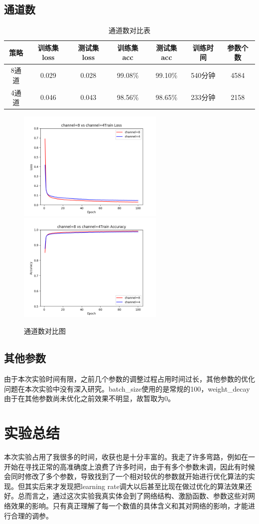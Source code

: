 \documentclass[11pt,utf8]{article}
\begin{document}
          \subsection*{通道数}
            \begin{table}[h]
              \centering
              \begin{tabular}{|c|c|c|c|c|c|c|}\hline
                策略&训练集loss&测试集loss&训练集acc&测试集acc&训练时间&参数个数\\\hline
                8通道&0.029&0.028&99.08\%&99.10\%&540分钟&4584\\
                4通道&0.046&0.043&98.56\%&98.65\%&233分钟&2158\\\hline
              \end{tabular}
              \caption{通道数对比表}
              \label{tab:Margin_settings}
            \end{table}
            \begin{figure}
              \begin{center}
                \includegraphics[width=7cm]{result/channel=8vschannel=4_loss.png}
                \includegraphics[width=7cm]{result/channel=8vschannel=4_acc.png}\\
                \caption{通道数对比图}
              \end{center}
            \end{figure}
          \subsection*{其他参数}
            \indent 由于本次实验时间有限，之前几个参数的调整过程占用时间过长，其他参数的优化问题在本次实验中没有深入研究。batch\_size使用的是常规的100，weight\_decay由于在其他参数尚未优化之前效果不明显，故暂取为0。\\
        \section*{实验总结}
          \indent 本次实验占用了我很多的时间，收获也是十分丰富的。我走了许多弯路，例如在一开始在寻找正常的高准确度上浪费了许多时间，由于有多个参数未调，因此有时候会同时修改了多个参数，导致找到了一个相对较优的参数就开始进行优化算法的实现。但其实后来才发现把learning rate调大以后甚至比现在做过优化的算法效果还好。总而言之，通过这次实验我真实体会到了网络结构、激励函数、参数这些对网络效果的影响。只有真正理解了每一个数值的具体含义和其对网络的影响，才能进行合理的调参。\\
      
    
\end{document}
